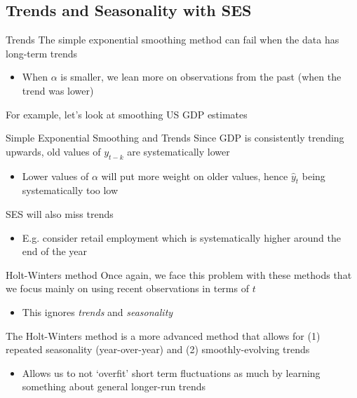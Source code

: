 \documentclass[aspectratio=169,t,11pt,table]{beamer}
\begin{document}
\subsection{Trends and Seasonality with SES}

\begin{frame}{Trends}
  The simple exponential smoothing method can fail when the data has long-term trends
  \begin{itemize}
    \item When $\alpha$ is smaller, we lean more on observations from the past (when the trend was lower)
  \end{itemize}

  \bigskip
  For example, let's look at smoothing US GDP estimates
\end{frame}


\begin{frame}{Simple Exponential Smoothing and Trends}
  Since GDP is consistently trending upwards, old values of $y_{t-k}$ are systematically lower
  \begin{itemize}
    \item Lower values of $\alpha$ will put more weight on older values, hence $\hat{y}_t$ being systematically too low
  \end{itemize}

  \bigskip
  SES will also miss trends
  \begin{itemize}
    \item E.g. consider retail employment which is systematically higher around the end of the year
  \end{itemize}
\end{frame}



\begin{frame}{Holt-Winters method}
  Once again, we face this problem with these methods that we focus mainly on using recent observations in terms of $t$
  \begin{itemize}
    \item This ignores \emph{trends} and \emph{seasonality}
  \end{itemize}

  \bigskip
  The \alert{Holt-Winters} method is a more advanced method that allows for (1) repeated seasonality (year-over-year) and (2) smoothly-evolving trends 
  \begin{itemize}
    \item Allows us to not `overfit' short term fluctuations as much by learning something about general longer-run trends
  \end{itemize}
\end{frame}
\end{document}
